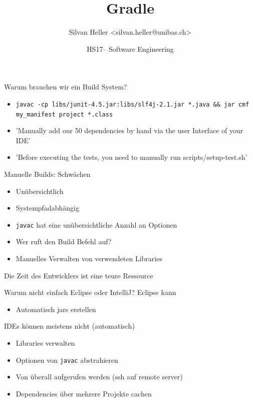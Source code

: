 \documentclass{beamer}
\title              {Gradle}
\author             {Silvan Heller \textless silvan.heller@unibas.ch\textgreater}
\institute          {Department Mathematik \& Informatik, Universität Basel}
\date               {HS17-- Software Engineering}
\begin{document}
\begin{frame}[t,plain]
\titlepage
\end{frame}
\begin{frame}{Warum brauchen wir ein Build System?}
	\begin{itemize}
		\item \texttt{javac -cp libs/junit-4.5.jar:libs/slf4j-2.1.jar *.java \&\& jar cmf my\_manifest project *.class}
		\item 'Manually add our 50 dependencies by hand via the user Interface of your IDE'
		\item 'Before executing the tests, you need to manually run scripts/setup-test.sh' 
	\end{itemize}
\end{frame}

\begin{frame}{Manuelle Builds: Schwächen}
	\begin{itemize}
		\item Unübersichtlich
		\item Systempfadabhängig
		\item \texttt{javac} hat eine unübersichtliche Anzahl an Optionen
		\item Wer ruft den Build Befehl auf? 
		\item Manuelles Verwalten von verwendeten Libraries
	\end{itemize}
		\begin{center}
			\begin{large}
				Die Zeit des Entwicklers ist eine teure Ressource
			\end{large}
		\end{center}
\end{frame}

\begin{frame}{Warum nicht einfach Eclipse oder IntelliJ?}
	Eclipse kann
	\begin{itemize}
		\item Automatisch jars erstellen
	\end{itemize}
	IDEs können meistens nicht (automatisch)
	\begin{itemize}
		\item Libraries verwalten
		\item Optionen von \texttt{javac} abstrahieren
		\item Von überall aufgerufen werden (ssh auf remote server)
		\item Dependencies über mehrere Projekte cachen
	\end{itemize}
\end{frame}
\end{document}
